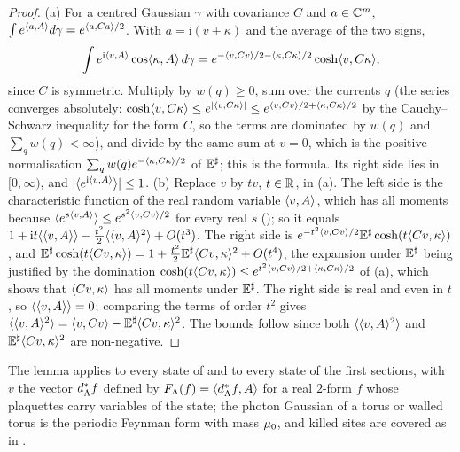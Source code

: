 \begin{proof}
(a) For a centred Gaussian $\gamma$ with covariance $C$ and $a\in\mathbb C^m$, $\int e^{\langle a,A\rangle}d\gamma=e^{\langle a,Ca\rangle/2}$. With $a=\mathrm i(v\pm\kappa)$ and the average of the two signs,
\[
\int e^{\mathrm i\langle v,A\rangle}\cos\langle \kappa,A\rangle\,d\gamma=e^{-\langle v,Cv\rangle/2-\langle \kappa,C\kappa\rangle/2}\cosh\langle v,C\kappa\rangle,
\]
since $C$ is symmetric. Multiply by $w(q)\ge0$, sum over the currents $q$ (the series converges absolutely: $\cosh\langle v,C\kappa\rangle\le e^{|\langle v,C\kappa\rangle|}\le e^{\langle v,Cv\rangle/2+\langle \kappa,C\kappa\rangle/2}$ by the Cauchy--Schwarz inequality for the form $C$, so the terms are dominated by $w(q)$ and $\sum_qw(q)<\infty$), and divide by the same sum at $v=0$, which is the positive normalisation $\sum_qw(q)e^{-\langle \kappa,C\kappa\rangle/2}$ of $\mathbb E^\sharp$; this is the formula. Its right side lies in $[0,\infty)$, and $|\langle e^{\mathrm i\langle v,A\rangle}\rangle|\le1$.
(b) Replace $v$ by $tv$, $t\in\mathbb R$, in (a). The left side is the characteristic function of the real random variable $\langle v,A\rangle$, which has all moments because $\langle e^{s\langle v,A\rangle}\rangle\le e^{s^2\langle v,Cv\rangle/2}$ for every real $s$ (); so it equals $1+\mathrm it\langle\langle v,A\rangle\rangle-\frac{t^2}2\langle\langle v,A\rangle^2\rangle+O(t^3)$. The right side is $e^{-t^2\langle v,Cv\rangle/2}\mathbb E^\sharp\cosh(t\langle Cv,\kappa\rangle)$, and $\mathbb E^\sharp\cosh(t\langle Cv,\kappa\rangle)=1+\frac{t^2}2\mathbb E^\sharp\langle Cv,\kappa\rangle^2+O(t^4)$, the expansion under $\mathbb E^\sharp$ being justified by the domination $\cosh(t\langle Cv,\kappa\rangle)\le e^{t^2\langle v,Cv\rangle/2+\langle \kappa,C\kappa\rangle/2}$ of (a), which shows that $\langle Cv,\kappa\rangle$ has all moments under $\mathbb E^\sharp$. The right side is real and even in $t$, so $\langle\langle v,A\rangle\rangle=0$; comparing the terms of order $t^2$ gives $\langle\langle v,A\rangle^2\rangle=\langle v,Cv\rangle-\mathbb E^\sharp\langle Cv,\kappa\rangle^2$. The bounds follow since both $\langle\langle v,A\rangle^2\rangle$ and $\mathbb E^\sharp\langle Cv,\kappa\rangle^2$ are non-negative.
\end{proof}

The lemma applies to every state of  and to every state of the first sections, with $v$ the vector $d^{*}_\Lambda f$ defined by $F_\Lambda(f)=\langle d^{*}_\Lambda f,A\rangle$ for a real $2$-form $f$ whose plaquettes carry variables of the state; the photon Gaussian of a torus or walled torus is the periodic Feynman form with mass $\mu_0$, and killed sites are covered as in .
